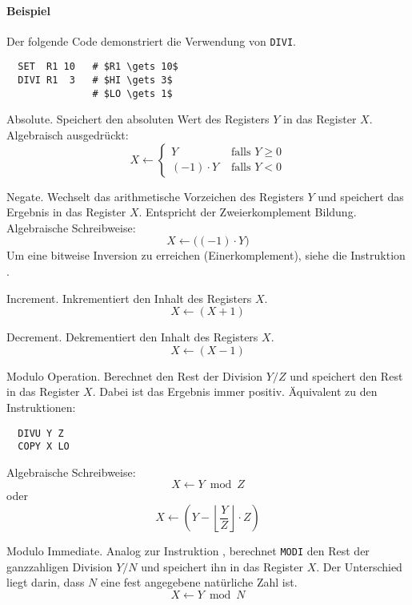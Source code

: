 \paragraph{Beispiel}
Der folgende Code demonstriert die Verwendung von \texttt{DIVI}.
\begin{lstlisting}
  SET  R1 10   # $R1 \gets 10$
  DIVI R1  3   # $HI \gets 3$
               # $LO \gets 1$
\end{lstlisting}




\glqq Absolute\grqq.
Speichert den absoluten Wert des Registers $Y$ in das Register $X$.
Algebraisch ausgedrückt:
\[
    X \gets
    \begin{cases}
      Y            & \text{ falls } Y \geq 0 \\
      (-1) \cdot Y & \text{ falls } Y < 0
    \end{cases}
\]



\glqq Negate\grqq.
Wechselt das arithmetische Vorzeichen des Registers $Y$ und speichert das
Ergebnis in das Register $X$. Entspricht der Zweierkomplement Bildung.
Algebraische Schreibweise:
\[
    X \gets \big( (-1) \cdot Y \big)
\]
Um eine bitweise Inversion zu erreichen (Einerkomplement), siehe die
Instruktion .



\glqq Increment\grqq.
Inkrementiert den Inhalt des Registers $X$.
\[
    X \gets ( X + 1 )
\]



\glqq Decrement\grqq.
Dekrementiert den Inhalt des Registers $X$.
\[
    X \gets ( X - 1 )
\]




Modulo Operation.
Berechnet den Rest der Division $Y/Z$ und speichert den Rest in das Register
$X$. Dabei ist das Ergebnis immer positiv.
Äquivalent zu den Instruktionen:
\begin{lstlisting}
  DIVU Y Z
  COPY X LO
\end{lstlisting}

Algebraische Schreibweise:
\[
    X \gets Y \bmod Z
\]
oder
\[
    X \gets \left(
      Y - \left\lfloor \frac{Y}{Z}  \right\rfloor \cdot Z
      \right)
\]


\glqq Modulo Immediate\grqq. Analog zur Instruktion , berechnet
\texttt{MODI} den Rest der ganzzahligen Division $Y / N$ und speichert ihn in
das Register $X$. Der Unterschied liegt darin, dass $N$ eine fest angegebene
natürliche Zahl ist.
\[
    X \gets Y \bmod N
\]

